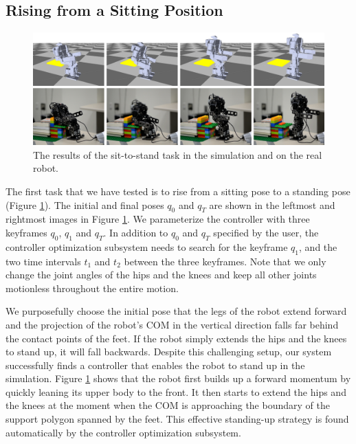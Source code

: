 \subsection{Rising from a Sitting Position}

\begin{figure}[!t]
  \centering
  \includegraphics[width=\textwidth]{figures/sit2Stand}
  \caption{The results of the sit-to-stand task in the simulation and on the real robot.}
  \label{fig:sit2Stand}
\end{figure}

The first task that we have tested is to rise from a sitting pose to a standing pose (Figure \ref{fig:sit2Stand}). The initial and final poses $q_0$ and $q_T$ are shown in the leftmost and rightmost images in Figure \ref{fig:sit2Stand}. We parameterize the controller with three keyframes $q_0$, $q_1$ and $q_T$. In addition to $q_0$ and $q_T$ specified by the user, the controller optimization subsystem needs to search for the keyframe $q_1$, and the two time intervals $t_1$ and $t_2$ between the three keyframes. Note that we only change the joint angles of the hips and the knees and keep all other joints motionless throughout the entire motion.

We purposefully choose the initial pose that the legs of the robot extend forward and the projection of the robot's COM in the vertical direction falls far behind the contact points of the feet. If the robot simply extends the hips and the knees to stand up, it will fall backwards. Despite this challenging setup, our system successfully finds a controller that enables the robot to stand up in the simulation. Figure \ref{fig:sit2Stand} shows that the robot first builds up a forward momentum by quickly leaning its upper body to the front. It then starts to extend the hips and the knees at the moment when the COM is approaching the boundary of the support polygon spanned by the feet. This effective standing-up strategy is found automatically by the controller optimization subsystem.

